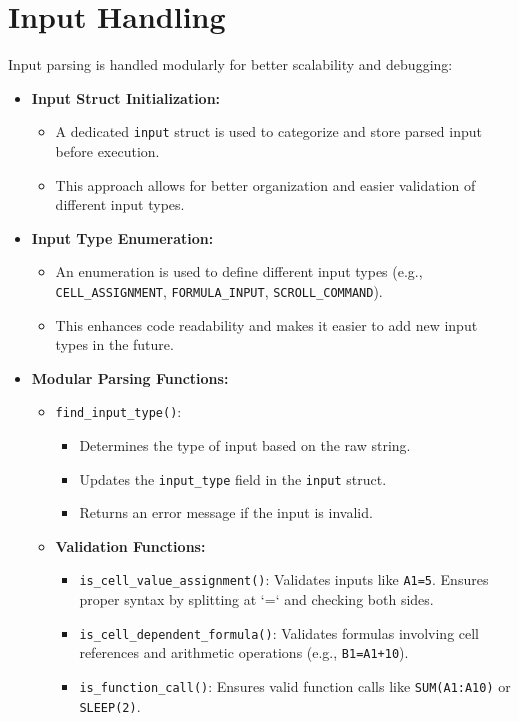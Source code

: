\documentclass{article}
\begin{document}
\section{Input Handling}
Input parsing is handled modularly for better scalability and debugging:

\begin{itemize}
    \item \textbf{Input Struct Initialization:}
    \begin{itemize}
        \item A dedicated \texttt{input} struct is used to categorize and store parsed input before execution.
        \item This approach allows for better organization and easier validation of different input types.
    \end{itemize}

    \item \textbf{Input Type Enumeration:}
    \begin{itemize}
        \item An enumeration is used to define different input types (e.g., \texttt{CELL\_ASSIGNMENT}, \texttt{FORMULA\_INPUT}, \texttt{SCROLL\_COMMAND}).
        \item This enhances code readability and makes it easier to add new input types in the future.
    \end{itemize}

    \item \textbf{Modular Parsing Functions:}
    \begin{itemize}
        \item \texttt{find\_input\_type()}:
        \begin{itemize}
            \item Determines the type of input based on the raw string.
            \item Updates the \texttt{input\_type} field in the \texttt{input} struct.
            \item Returns an error message if the input is invalid.
        \end{itemize}
        
        \item \textbf{Validation Functions:}
        \begin{itemize}
            \item \texttt{is\_cell\_value\_assignment()}: Validates inputs like \texttt{A1=5}. Ensures proper syntax by splitting at `=` and checking both sides.
            \item \texttt{is\_cell\_dependent\_formula()}: Validates formulas involving cell references and arithmetic operations (e.g., \texttt{B1=A1+10}).
            \item \texttt{is\_function\_call()}: Ensures valid function calls like \texttt{SUM(A1:A10)} or \texttt{SLEEP(2)}.
        \end{itemize}


\end{itemize}
\end{itemize}
\end{document}

